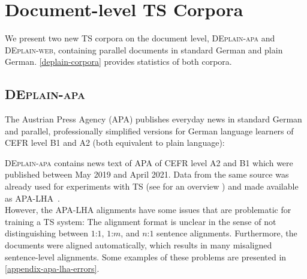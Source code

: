 \documentclass[11pt]{article}
\begin{document}
\begin{table*}[htb]
\caption{Overview of the corpora of \textsc{DEplain} including meta data. 
} 

\label{deplain-corpora}
\end{table*}


\section{Document-level TS Corpora}
We present two new TS corpora on the document level, \textsc{DEplain-apa} and \textsc{DEplain-web}, containing 
parallel documents in standard German and plain German. 
  \autoref{deplain-corpora} provides statistics of both corpora. 



\subsection{\textsc{DEplain-apa}}
\label{sec-deplain-apa}
The Austrian Press Agency (APA) publishes everyday news in standard German and parallel, professionally simplified versions for German language learners of CEFR level B1 and A2 (both equivalent to plain language):

\textsc{DEplain-apa} contains news text of APA of CEFR level A2 and B1 which were published between May 2019 and April 2021. Data from the same source was already used for experiments with TS (see for an overview \citet{ebling-etal-2022-automatic}) and made available as APA-LHA~\cite{spring-etal-2021-exploring}. \\
However, the APA-LHA alignments  have some issues that are problematic for training a TS system: The alignment format is unclear in the sense of not distinguishing between $1$:$1$, $1$:$m$, and $n$:$1$ sentence alignments. Furthermore, the documents were aligned automatically, which results in many misaligned sentence-level alignments. Some examples of these problems are presented in \autoref{appendix-apa-lha-errors}.\par
\end{document}
